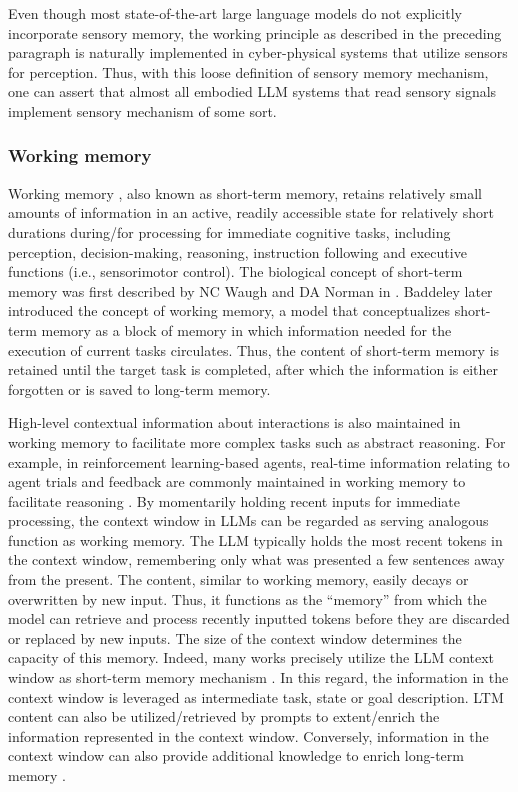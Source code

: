 \documentclass[10pt,journal,compsoc]{IEEEtran}
\begin{document}
	Even though most state-of-the-art large language models do not explicitly incorporate sensory memory, the working principle as described in the preceding paragraph is naturally implemented in cyber-physical systems that utilize sensors for perception. Thus, with this loose definition of sensory memory mechanism, one can assert that almost all embodied LLM systems that read sensory signals implement sensory  mechanism of some sort. 
	
	\subsubsection{Working memory}
	Working memory \cite{lu2023memochat,park2023generative,liu2023think,wang2023voyager}, also known as short-term memory, retains relatively small amounts of information in an active, readily accessible state for relatively short durations during/for processing for immediate cognitive tasks, including perception, decision-making, reasoning, instruction following and executive functions (i.e., sensorimotor control). The biological concept of short-term memory was first described by NC Waugh and DA Norman in \cite{waugh1965primary}. Baddeley \cite{baddeley1992working} later introduced the concept of working memory, a model that conceptualizes short-term memory as a block of memory in which information needed for the execution of current tasks circulates. Thus, the content of short-term memory is retained until the target task is completed, after which the information is either forgotten or is saved to long-term memory. 
	
	High-level contextual information about interactions is also maintained in working memory to facilitate more complex tasks such as abstract reasoning. For example, in reinforcement learning-based agents, real-time information relating to agent trials and feedback are commonly maintained in working memory to facilitate reasoning \cite{shinn2024reflexion}. By momentarily holding recent inputs for immediate processing, the context window in LLMs can be regarded as serving analogous function as working memory. The LLM typically holds the most recent tokens in the context window, remembering only what was presented a few sentences away from the present. The content, similar to working memory, easily decays or overwritten by new input. Thus, it functions as the “memory” from which the model can retrieve and process recently inputted tokens before they are discarded or replaced by new inputs. The size of the context window determines the capacity of this memory. Indeed, many works precisely utilize the LLM context window as short-term memory mechanism \cite{hatalis2023memory,packer2023memgpt,chen2023walking}. In this regard, the information in the context window is leveraged as intermediate task, state or goal description. LTM content can also be utilized/retrieved by prompts to extent/enrich the information represented in the context window. Conversely, information in the context window can also provide additional knowledge to enrich long-term memory \cite{li2024needlebench,xiao2024infllm}. 
	
\end{document}
